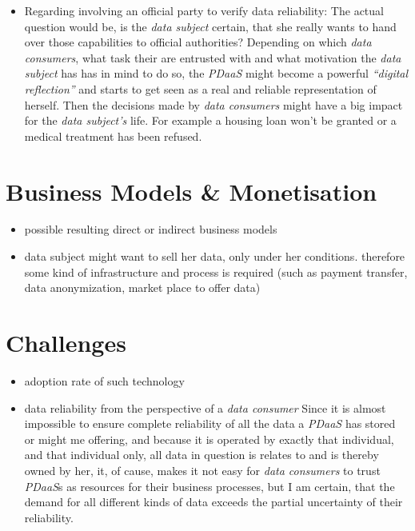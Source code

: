 \documentclass[12pt,english,a4paper,titlepage,cleardoublepage=empty,dottedtoc]{report}
\providecommand{\tightlist}{%
  \setlength{\itemsep}{0pt}\setlength{\parskip}{0pt}}
\begin{document}
\begin{itemize}
\tightlist
\item
  Regarding involving an official party to verify data reliability: The
  actual question would be, is the \emph{data subject} certain, that she
  really wants to hand over those capabilities to official authorities?
  Depending on which \emph{data consumers}, what task their are
  entrusted with and what motivation the \emph{data subject} has has in
  mind to do so, the \emph{PDaaS} might become a powerful
  \emph{``digital reflection''} and starts to get seen as a real and
  reliable representation of herself. Then the decisions made by
  \emph{data consumers} might have a big impact for the \emph{data
  subject's} life. For example a housing loan won't be granted or a
  medical treatment has been refused.
\end{itemize}

\section{Business Models \&
Monetisation}\label{business-models-monetisation}

\begin{itemize}
\tightlist
\item
  possible resulting direct or indirect business models
\item
  data subject might want to sell her data, only under her conditions.
  therefore some kind of infrastructure and process is required (such as
  payment transfer, data anonymization, market place to offer data)
\end{itemize}

\section{Challenges}\label{challenges}

\begin{itemize}
\item
  adoption rate of such technology
\item
  data reliability from the perspective of a \emph{data consumer} Since
  it is almost impossible to ensure complete reliability of all the data
  a \emph{PDaaS} has stored or might me offering, and because it is
  operated by exactly that individual, and that individual only, all
  data in question is relates to and is thereby owned by her, it, of
  cause, makes it not easy for \emph{data consumers} to trust
  \emph{PDaaS}s as resources for their business processes, but I am
  certain, that the demand for all different kinds of data exceeds the
  partial uncertainty of their reliability.
\end{itemize}
\end{document}

